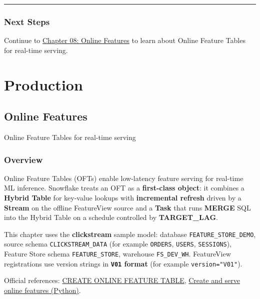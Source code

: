 \documentclass[
  letterpaper,
  DIV=11,
  numbers=noendperiod]{scrreprt}
\begin{document}
\begin{center}\rule{0.5\linewidth}{0.5pt}\end{center}

\hypertarget{next-steps-7}{%
\section{Next Steps}\label{next-steps-7}}

Continue to \protect\hyperlink{online-features}{Chapter 08: Online
Features} to learn about Online Feature Tables for real-time serving.

\part{Production}

\hypertarget{online-features}{%
\chapter{Online Features}\label{online-features}}

Online Feature Tables for real-time serving

\hfill\break

\hypertarget{overview-8}{%
\section{Overview}\label{overview-8}}

Online Feature Tables (OFTs) enable low-latency feature serving for
real-time ML inference. Snowflake treats an OFT as a \textbf{first-class
object}: it combines a \textbf{Hybrid Table} for key-value lookups with
\textbf{incremental refresh} driven by a \textbf{Stream} on the offline
FeatureView source and a \textbf{Task} that runs \textbf{MERGE} SQL into
the Hybrid Table on a schedule controlled by \textbf{TARGET\_LAG}.

This chapter uses the \textbf{clickstream} sample model: database
\texttt{FEATURE\_STORE\_DEMO}, source schema \texttt{CLICKSTREAM\_DATA}
(for example \texttt{ORDERS}, \texttt{USERS}, \texttt{SESSIONS}),
Feature Store schema \texttt{FEATURE\_STORE}, warehouse
\texttt{FS\_DEV\_WH}. FeatureView registrations use version strings in
\textbf{\texttt{V01} format} (for example \texttt{version="V01"}).

Official references:
\href{https://docs.snowflake.com/en/sql-reference/sql/create-online-feature-table}{CREATE
ONLINE FEATURE TABLE},
\href{https://docs.snowflake.com/en/developer-guide/snowflake-ml/feature-store/create-and-serve-online-features-python}{Create
and serve online features (Python)}.
\end{document}
